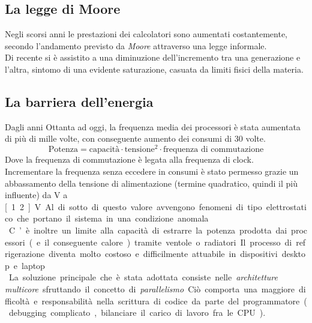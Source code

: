 \subsection{La legge di Moore}
Negli scorsi anni le prestazioni dei calcolatori sono aumentati costantemente, secondo l'andamento previsto da \textit{Moore} attraverso una legge informale.\\
Di recente si è assistito a una diminuzione dell’incremento tra una generazione e l’altra, sintomo di una evidente saturazione, casuata da limiti fisici della materia.

\subsection{La barriera dell'energia}
Dagli anni Ottanta ad oggi, la frequenza media dei processori è stata aumentata di più di mille volte, con conseguente aumento dei consumi di 30 volte.
\begin{equation*}
\text{Potenza} = \text{capacità}\cdot \text{tensione}^2\cdot \text{frequenza di commutazione}
\end{equation*}
Dove la frequenza di commutazione è legata alla frequenza di clock.\\
Incrementare la frequenza senza eccedere in consumi è stato permesso grazie un abbassamento della tensione di alimentazione (termine quadratico, quindi il più influente) da \unit[5]{V} a \unit[1.2]{V}. Al di sotto di questo valore avvengono fenomeni di tipo elettrostatico che portano il sistema in una condizione anomala.\\
C’è inoltre un limite alla capacità di estrarre la potenza prodotta dai processori (e il conseguente calore) tramite ventole o radiatori. Il processo di refrigerazione diventa molto
costoso e difficilmente attuabile in dispositivi desktop e laptop.\\

La soluzione principale che è stata adottata consiste nelle \textit{architetture multicore} sfruttando il concetto di \textit{parallelismo}. Ciò comporta una maggiore difficoltà e responsabilità nella scrittura di codice da parte del programmatore (debugging complicato, bilanciare il carico di lavoro fra le CPU).




